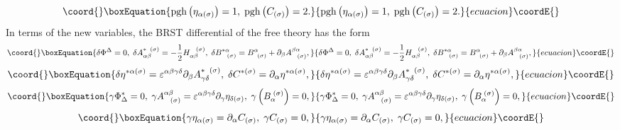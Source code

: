 \documentclass[a4paper,12pt]{article}
\begin{document}
\begin{equation}\coord{}\boxEquation{
\mathrm{pgh}\left( \eta _{\alpha (\sigma )}\right) =1,\;\mathrm{pgh}\left(
C_{(\sigma )}\right) =2.  \label{fcola12}
}{
\mathrm{pgh}\left( \eta _{\alpha (\sigma )}\right) =1,\;\mathrm{pgh}\left(
C_{(\sigma )}\right) =2.  }{ecuacion}\coordE{}\end{equation}
In terms of the new variables, the BRST differential \coordHE{} of
the free theory has the form 
\begin{equation}\coord{}\boxEquation{
\delta \Phi ^{\Delta }=0,\;\delta A_{\alpha \beta }^{*\;\;(\sigma )}=-\frac{1
}{2}H_{\alpha \beta }^{\;\;\;(\sigma )},\;\delta B_{\;\;\;(\sigma
)}^{*\alpha }=B_{\;\;(\sigma )}^{\alpha }+\partial _{\beta }A_{\;\;\;(\sigma
)}^{\beta \alpha },  \label{fcola13}
}{
\delta \Phi ^{\Delta }=0,\;\delta A_{\alpha \beta }^{*\;\;(\sigma )}=-\frac{1
}{2}H_{\alpha \beta }^{\;\;\;(\sigma )},\;\delta B_{\;\;\;(\sigma
)}^{*\alpha }=B_{\;\;(\sigma )}^{\alpha }+\partial _{\beta }A_{\;\;\;(\sigma
)}^{\beta \alpha },  }{ecuacion}\coordE{}\end{equation}
\begin{equation}\coord{}\boxEquation{
\delta \eta ^{*\alpha (\sigma )}=\varepsilon ^{\alpha \beta \gamma \delta
}\partial _{\beta }A_{\gamma \delta }^{*\;\;(\sigma )},\;\delta C^{*(\sigma
)}=\partial _{\alpha }\eta ^{*\alpha (\sigma )},  \label{fcola14}
}{
\delta \eta ^{*\alpha (\sigma )}=\varepsilon ^{\alpha \beta \gamma \delta
}\partial _{\beta }A_{\gamma \delta }^{*\;\;(\sigma )},\;\delta C^{*(\sigma
)}=\partial _{\alpha }\eta ^{*\alpha (\sigma )},  }{ecuacion}\coordE{}\end{equation}
\begin{equation}\coord{}\boxEquation{
\gamma \Phi _{\Delta }^{*}=0,\;\gamma A_{\;\;\;(\sigma )}^{\alpha \beta
}=\varepsilon ^{\alpha \beta \gamma \delta }\partial _{\gamma }\eta _{\delta
(\sigma )},\;\gamma \left( B_{\alpha }^{\;(\sigma )}\right) =0,
\label{fcola15}
}{
\gamma \Phi _{\Delta }^{*}=0,\;\gamma A_{\;\;\;(\sigma )}^{\alpha \beta
}=\varepsilon ^{\alpha \beta \gamma \delta }\partial _{\gamma }\eta _{\delta
(\sigma )},\;\gamma \left( B_{\alpha }^{\;(\sigma )}\right) =0,
}{ecuacion}\coordE{}\end{equation}
\begin{equation}\coord{}\boxEquation{
\gamma \eta _{\alpha (\sigma )}=\partial _{\alpha }C_{(\sigma )},\;\gamma
C_{(\sigma )}=0,  \label{fcola16}
}{
\gamma \eta _{\alpha (\sigma )}=\partial _{\alpha }C_{(\sigma )},\;\gamma
C_{(\sigma )}=0,  }{ecuacion}\coordE{}\end{equation}
\end{document}
